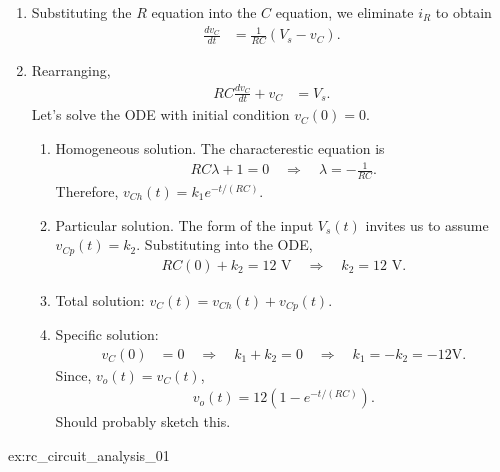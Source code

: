 \documentclass[electronics.tex]{subfiles}
\begin{document}
{\begin{enumerate}
\begin{enumerate}
			\item Substituting the $R$ equation into the $C$ equation, we eliminate $i_R$ to obtain
				\begin{align*}
					\frac{d v_C}{d t} &= \frac{1}{RC} \left(V_s - v_C\right).
				\end{align*}
			\item Rearranging, 
				\begin{align*}
					R C \frac{d v_C}{d t} + v_C &=  V_s.
				\end{align*}
				Let's solve the ODE with initial condition $v_C(0) = 0$.
				\begin{enumerate}
					\item Homogeneous solution. The characterestic equation is
					\begin{align*}
						R C \lambda + 1 = 0 \quad \Rightarrow \quad \lambda = -\frac{1}{R C}.
					\end{align*}
					Therefore, $v_{Ch}(t) = k_1 e^{-t/(RC)}$.
					\item Particular solution. The form of the input $V_s(t)$ invites us to assume $v_{Cp}(t) = k_2$. Substituting into the ODE,
					\begin{align*}
						R C (0) + k_2 = 12\text{ V} \quad \Rightarrow \quad k_2 = 12\text{ V}.
					\end{align*}
					\item Total solution: $v_C(t) = v_{Ch}(t) + v_{Cp}(t)$.
					\item Specific solution:
					\begin{align*}
						v_C(0) &= 0 \quad \Rightarrow \quad
						k_1 + k_2 = 0 \quad \Rightarrow \quad
						k_1 = -k_2 = -12\text {V}.
					\end{align*}
					Since, $v_o(t) = v_C(t)$,
					\begin{align*}
						v_o(t) = 12 (1 - e^{-t/(R C)}).
					\end{align*}
					Should probably sketch this.
				\end{enumerate}
		\end{enumerate}
	\end{enumerate}
}{%
ex:rc_circuit_analysis_01%
}
\end{document}
